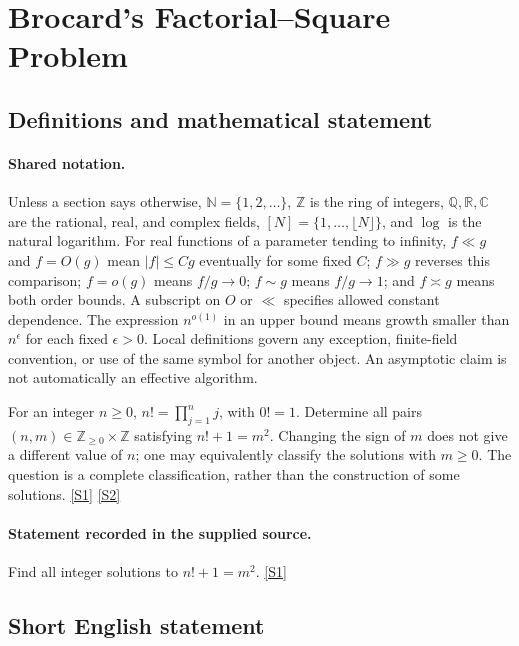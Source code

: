 \documentclass[11pt,a4paper]{article}
\newcommand{\N}{\mathbb{N}}
\newcommand{\Z}{\mathbb{Z}}
\newcommand{\Q}{\mathbb{Q}}
\newcommand{\R}{\mathbb{R}}
\newcommand{\C}{\mathbb{C}}
\newcommand{\sref}[2]{\hyperlink{source:#1:#2}{[S#2]}}
\begin{document}
\section{Brocard's Factorial--Square Problem}\label{statement}


\subsection{Definitions and mathematical statement}

\paragraph{Shared notation.}Unless a section says otherwise, $\N=\{1,2,\ldots\}$,
$\Z$ is the ring of integers, $\Q,\R,\C$ are the rational, real, and complex
fields, $[N]=\{1,\ldots,\lfloor N\rfloor\}$, and $\log$ is the natural
logarithm. For real functions of a parameter tending to infinity,
$f\ll g$ and $f=O(g)$ mean $|f|\leq Cg$ eventually for some fixed $C$;
$f\gg g$ reverses this comparison; $f=o(g)$ means $f/g\to0$;
$f\sim g$ means $f/g\to1$; and $f\asymp g$ means both order bounds.
A subscript on $O$ or $\ll$ specifies allowed constant dependence.
The expression $n^{o(1)}$ in an upper bound means growth smaller than
$n^\epsilon$ for each fixed $\epsilon>0$. Local definitions govern any
exception, finite-field convention, or use of the same symbol for another
object. An asymptotic claim is not automatically an effective algorithm.



For an integer $n\geq0$, $n!=\prod_{j=1}^{n}j$, with $0!=1$. Determine all pairs $(n,m)\in\Z_{\geq0}\times\Z$ satisfying $n!+1=m^2$. Changing the sign of $m$ does not give a different value of $n$; one may equivalently classify the solutions with $m\geq0$. The question is a complete classification, rather than the construction of some solutions. \sref{statement}{1} \sref{statement}{2}

\paragraph{Statement recorded in the supplied source.}
Find all integer solutions to $n! + 1 = m^2$. \sref{statement}{1}

\subsection{Short English statement}
\end{document}
